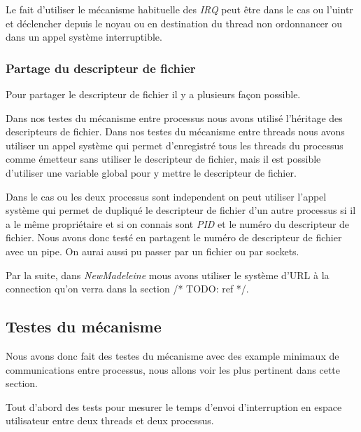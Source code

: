 Le fait d'utiliser le mécanisme habituelle des \emph{IRQ} peut être dans le cas ou l'uintr et déclencher depuis le noyau ou en destination du thread non ordonnancer ou dans un appel système interruptible.

\subsubsection{Partage du descripteur de fichier}
\label{sec:shareFD}

Pour partager le descripteur de fichier il y a plusieurs façon possible.

Dans nos testes du mécanisme entre processus nous avons utilisé l'héritage des descripteurs de fichier.
Dans nos testes du mécanisme entre threads nous avons utiliser un appel système qui permet d'enregistré tous les threads du processus comme émetteur sans utiliser le descripteur de fichier, %
mais il est possible d'utiliser une variable global pour y mettre le descripteur de fichier.

Dans le cas ou les deux processus sont independent on peut utiliser l'appel système  qui permet de dupliqué le descripteur de fichier d'un autre processus si il a le même propriétaire et si on connais sont \emph{PID} et le numéro du descripteur de fichier.
Nous avons donc testé en partagent le numéro de descripteur de fichier avec un pipe.
On aurai aussi pu passer par un fichier ou par sockets.

Par la suite, dans \emph{NewMadeleine} mous avons utiliser le système d'URL à la connection qu'on verra dans la section /* TODO: ref */.

\subsection{Testes du mécanisme}

Nous avons donc fait des testes du mécanisme avec des example minimaux de communications entre processus, nous allons voir les plus pertinent dans cette section.

Tout d'abord des tests pour mesurer le temps d'envoi d'interruption en espace utilisateur entre deux threads et deux processus.

